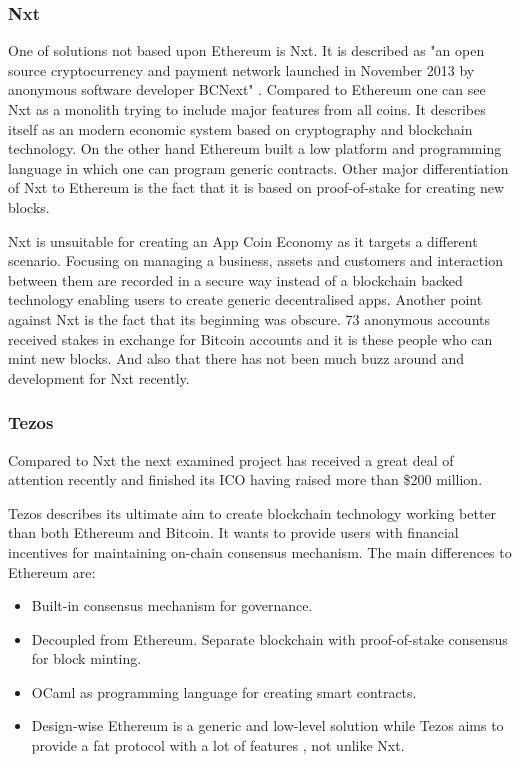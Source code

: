 \subsubsection{Nxt}
One of solutions not based upon Ethereum is Nxt. It is described as "an open source cryptocurrency and payment network launched in November 2013 by anonymous software developer BCNext" \cite{Nxt}. Compared to Ethereum one can see Nxt as a monolith trying to include major features from all coins. It describes itself as an modern economic system based on cryptography and blockchain technology. On the other hand Ethereum built a low platform and programming language in which one can program generic contracts. Other major differentiation of Nxt to Ethereum is the fact that it is based on proof-of-stake for creating new blocks.

\medskip

Nxt is unsuitable for creating an App Coin Economy as it targets a different scenario. Focusing on managing a business, assets and customers and interaction between them are recorded in a secure way instead of a blockchain backed technology enabling users to create generic decentralised apps. Another point against Nxt is the fact that its beginning was obscure. 73 anonymous accounts received stakes in exchange for Bitcoin accounts and it is these people who can mint new blocks. And also that there has not been much buzz around and development for Nxt recently.

\subsubsection{Tezos}
Compared to Nxt the next examined project has received a great deal of attention recently and finished its ICO having raised more than \$200 million.

Tezos describes its ultimate aim to create blockchain technology working better than both Ethereum and Bitcoin. It wants to provide users with financial incentives for maintaining on-chain consensus mechanism. The main differences to Ethereum are:

\begin{itemize}
    \item Built-in consensus mechanism for governance.
    \item Decoupled from Ethereum. Separate blockchain with proof-of-stake consensus for block minting.
    \item OCaml as programming language for creating smart contracts.
    \item Design-wise Ethereum is a generic and low-level solution while Tezos aims to provide a fat protocol with a lot of features \cite{TezosEth}, not unlike Nxt.
\end{itemize}

